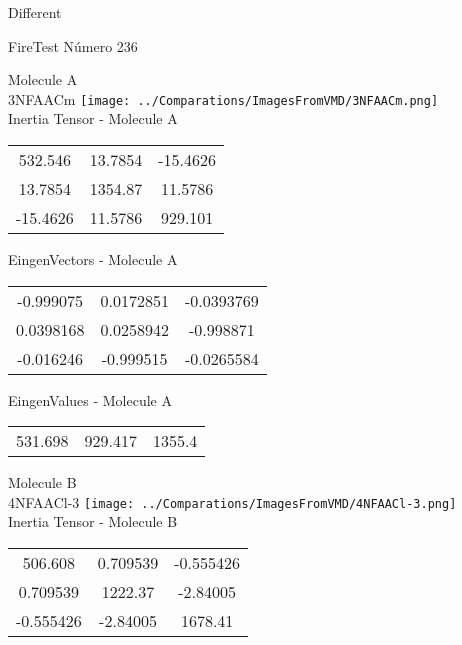 \begin{center}
\vtab
\vtab
\textcolor{NavyBlue}{\Large Different}
\end{center}

 \newpage

\vtab[-2cm]
\begin{center}
{\large FireTest \tab Número 236}
\end{center}
\begin{multicols}{2}
\begin{center}

Molecule A \\ 
3NFAACm
\texttt{[image: ../Comparations/ImagesFromVMD/3NFAACm.png]}
\\
Inertia Tensor - Molecule A \\
\vtab

\begin{tabular}{|c c c|}
532.546	 & 	13.7854	 & 	-15.4626	 \\
13.7854	 & 	1354.87	 & 	11.5786	 \\
-15.4626	 & 	11.5786	 & 	929.101
\end{tabular}

\vtab
 EingenVectors - Molecule A     \\
\vtab
\begin{tabular}{|c c c|}
-0.999075	 & 	0.0172851	 & 	-0.0393769	 \\
0.0398168	 & 	0.0258942	 & 	-0.998871	 \\
-0.016246	 & 	-0.999515	 & 	-0.0265584
\end{tabular}

\vtab
 EingenValues - Molecule A     \\
\vtab
\begin{tabular}{|c c c|}
531.698	 & 	929.417	 & 	1355.4	 \\
\end{tabular}
\columnbreak

Molecule B \\ 
4NFAACl-3
\texttt{[image: ../Comparations/ImagesFromVMD/4NFAACl-3.png]}
\\
Inertia Tensor - Molecule B \\
\vtab

\begin{tabular}{|c c c|}
506.608	 & 	0.709539	 & 	-0.555426	 \\
0.709539	 & 	1222.37	 & 	-2.84005	 \\
-0.555426	 & 	-2.84005	 & 	1678.41
\end{tabular}


\end{center}
\end{multicols}
